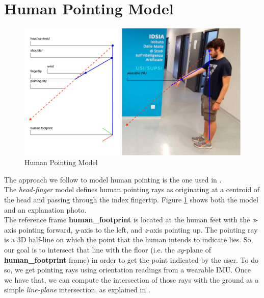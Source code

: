 \section{Human Pointing Model} \label{sec:1.2}
\begin{figure}
	\centering
	\includegraphics[width=\textwidth]{img/gabryPointing.png}%
	\caption{Human Pointing Model}
	\label{fig:pointingModel}
\end{figure}
The approach we follow to model human pointing is the one used in \cite{gromov2018robot}.\\
The \emph{head-finger} model defines human pointing rays as originating at a centroid of the head and passing through the index fingertip. Figure \ref{fig:pointingModel} shows both the model and an explanation photo.\\
The reference frame \textbf{human\_footprint} is located at the human feet with the \emph{x}-axis pointing forward, \emph{y}-axis to the left, and \emph{z}-axis pointing up. The pointing ray is a 3D half-line on which the point that the human intends to indicate lies. So, our goal is to intersect that line with the floor (i.e. the \emph{xy}-plane of \textbf{human\_footprint} frame) in order to get the point indicated by the user. To do so, we get pointing rays using orientation readings from a wearable \ac{IMU}. Once we have that, we can compute the intersection of those rays with the ground as a simple \emph{line-plane} intersection, as explained in \cite{O'Rourke:1998:CGC:289380}.

